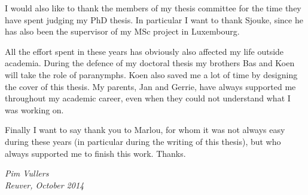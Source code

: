 I would also like to thank the members of my thesis committee for the time they
have spent judging my PhD thesis. In particular I want to thank Sjouke, since he
has also been the supervisor of my MSc project in Luxembourg.

All the effort spent in these years has obviously also affected my life outside
academia. During the defence of my doctoral thesis my brothers Bas and Koen will
take the role of paranymphs. Koen also saved me a lot of time by designing the 
cover of this thesis. My parents, Jan and Gerrie, have always supported me 
throughout my academic career, even when they could not understand what I was 
working on.

Finally I want to say thank you to Marlou, for whom it was not always easy
during these years (in particular during the writing of this thesis), but who
always supported me to finish this work. Thanks.

\begin{flushright}\it
  Pim Vullers \\ 
  Reuver, October 2014
\end{flushright}
